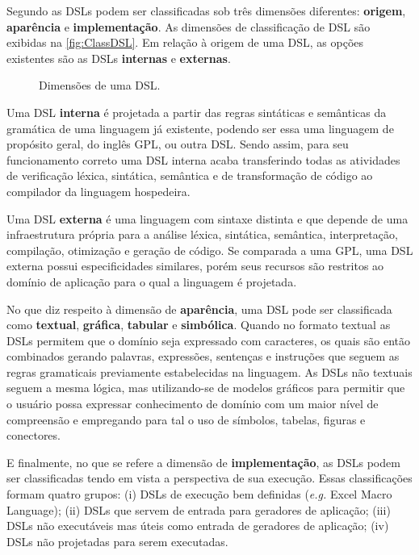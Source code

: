 Segundo  as \acp{DSL} podem ser classificadas sob três dimensões diferentes: \textbf{origem}, \textbf{aparência} e \textbf{implementação}. 
As dimensões de classificação de \ac{DSL} são exibidas na \autoref{fig:ClassDSL}. 
Em relação à origem de uma \ac{DSL}, as opções existentes são as \acp{DSL} \textbf{internas} e \textbf{externas}.

\begin{figure}[!htb]
    \centering
    \caption{Dimensões de uma DSL.}
    
    \label{fig:ClassDSL}
\end{figure}
    
Uma \ac{DSL} \textbf{interna} é projetada a partir das regras sintáticas e semânticas da gramática de uma linguagem já existente, podendo ser essa uma linguagem de propósito geral, do inglês \ac{GPL}, ou outra \ac{DSL}. 
Sendo assim, para seu funcionamento correto uma \ac{DSL} interna acaba transferindo todas as atividades de verificação léxica, sintática, semântica e de transformação de código ao compilador da linguagem hospedeira.

Uma \ac{DSL} \textbf{externa} é uma linguagem com sintaxe distinta e que depende de uma infraestrutura própria para a análise léxica, sintática, semântica, interpretação, compilação, otimização e geração de código. 
Se comparada a uma \ac{GPL}, uma \ac{DSL} externa possui especificidades similares, porém seus recursos são restritos ao domínio de aplicação para o qual a linguagem é projetada.
    
No que diz respeito à dimensão de \textbf{aparência}, uma \ac{DSL} pode ser classificada como \textbf{textual}, \textbf{gráfica}, \textbf{tabular} e \textbf{simbólica}. 
Quando no formato textual as \acp{DSL} permitem que o domínio seja expressado com caracteres, os quais são então combinados gerando palavras, expressões, sentenças e instruções que seguem as regras gramaticais previamente estabelecidas na linguagem. 
As \acp{DSL} não textuais seguem a mesma lógica, mas utilizando-se de modelos gráficos para permitir que o usuário possa expressar conhecimento de domínio com um maior nível de compreensão e empregando para tal o uso de símbolos, tabelas, figuras e conectores. 
    
E finalmente, no que se refere a dimensão de \textbf{implementação}, as \acp{DSL} podem ser classificadas tendo em vista a perspectiva de sua execução. 
Essas classificações formam quatro grupos: 
(i) \acp{DSL} de execução bem definidas (\textit{e.g.} Excel Macro Language); 
(ii) \acp{DSL} que servem de entrada para geradores de aplicação; 
(iii) \acp{DSL} não executáveis mas úteis como entrada de geradores de aplicação; 
(iv) \acp{DSL} não projetadas para serem executadas.

